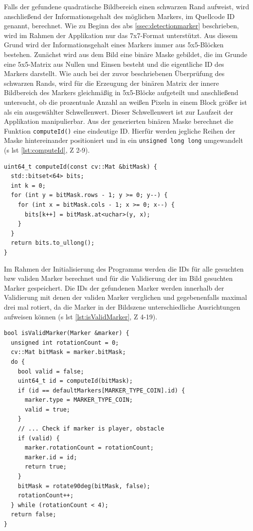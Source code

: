 \noindent Falls der gefundene quadratische Bildbereich einen schwarzen Rand aufweist, wird anschließend der Informationsgehalt des möglichen Markers, im Quellcode \glqq ID\grqq{} genannt, berechnet. Wie zu Beginn des \acs{abs} \ref{ssec:detectionmarker} beschrieben, wird im Rahmen der Applikation nur das 7x7-Format unterstützt. Aus diesem Grund wird der Informationsgehalt eines Markers immer aus 5x5-Blöcken bestehen. Zunächst wird aus dem Bild eine binäre Maske gebildet, die im Grunde eine 5x5-Matrix aus Nullen und Einsen besteht und die eigentliche ID des Markers darstellt. Wie auch bei der zuvor beschriebenen Überprüfung des schwarzen Rands, wird für die Erzeugung der binären Matrix der innere Bildbereich des Markers gleichmäßig in 5x5-Blöcke aufgeteilt und anschließend untersucht, ob die prozentuale Anzahl an weißen Pixeln in einem Block größer ist als ein ausgewählter Schwellenwert. Dieser Schwellenwert ist zur Laufzeit der Applikation manipulierbar. Aus der generierten binären Maske berechnet die Funktion \texttt{computeId()} eine eindeutige ID. Hierfür werden jegliche Reihen der Maske hintereinander positioniert und in ein \texttt{unsigned long long} umgewandelt (\acs{s} \acs{lst} \ref{lst:computeId}, \acs{Z} 2-9).

\newpage

\begin{lstlisting}[caption={Die Funktion \texttt{detectormarkerbased.cpp/computeId()} konvertiert aus einer gegebenen binären Maske eine eindeutige ID}, label={lst:computeId}]
uint64_t computeId(const cv::Mat &bitMask) {
  std::bitset<64> bits;
  int k = 0;
  for (int y = bitMask.rows - 1; y >= 0; y--) {
    for (int x = bitMask.cols - 1; x >= 0; x--) {
      bits[k++] = bitMask.at<uchar>(y, x);
    }
  }
  return bits.to_ullong();
}
\end{lstlisting}

\noindent Im Rahmen der Initialisierung des Programms werden die IDs für alle gesuchten \acs{bzw} validen Marker berechnet und für die Validierung der im Bild gesuchten Marker gespeichert. Die IDs der gefundenen Marker werden innerhalb der Validierung mit denen der validen Marker verglichen und gegebenenfalls maximal drei mal rotiert, da die Marker in der Bildszene unterschiedliche Ausrichtungen aufweisen können (\acs{s} \acs{lst} \ref{lst:isValidMarker}, \acs{Z} 4-19).

\begin{lstlisting}[caption={Die Funktion \texttt{detectormarkerbased.cpp/isValidMarker()} überprüft, ob der übergebene Marker gesucht wird \acs{bzw} valide ist}, label={lst:isValidMarker}]
bool isValidMarker(Marker &marker) {
  unsigned int rotationCount = 0;
  cv::Mat bitMask = marker.bitMask;
  do {
    bool valid = false;
    uint64_t id = computeId(bitMask);
    if (id == defaultMarkers[MARKER_TYPE_COIN].id) {
      marker.type = MARKER_TYPE_COIN;
      valid = true;
    }
    // ... Check if marker is player, obstacle
    if (valid) {
      marker.rotationCount = rotationCount;
      marker.id = id;
      return true;
    }
    bitMask = rotate90deg(bitMask, false);
    rotationCount++;
  } while (rotationCount < 4);
  return false;
}
\end{lstlisting}

